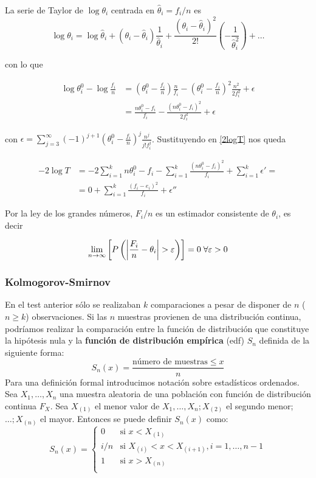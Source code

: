 	La serie de Taylor de $\log \theta_i$ centrada en 
$\hat{\theta}_i = f_i/n$ es
	\[ \log \theta_i = 
			\log \hat{\theta}_i +
			(\theta_i - \hat{\theta}_i)
				\frac{1}{\hat{\theta}_i} +
			\frac{(\theta_i - \hat{\theta}_i)^2}{2!}
				\left(-\frac{1}{\hat{\theta}_i^2}\right) +
			\dots
	\]
	
	con lo que
	
	\begin{align*}	
	 \log \theta_i^0 - \log \frac{f_i}{n} & = 
			\left(
				\theta_i^0 - \frac{f_i}{n}
			\right) \frac{n}{f_i} -
			\left(
				\theta_i^0 - \frac{f_i}{n}
			\right)^2 \frac{n^2}{2f_i^2} + \epsilon \\
		&= \frac{n\theta_i^0 - f_i}{f_i} -
			\frac{(n\theta_i^0 - f_i)^2}{2f_i^2} +\epsilon
	\end{align*}
	
	con $\epsilon = \sum\limits_{j=3}^\infty
			(-1)^{j+1} 
			\left( \theta_i^0 - \frac{f_i}{n}\right)^j
			\frac{n^j}{j!f_i^j}$. Sustituyendo en \ref{2logT} 
nos queda
			
	\begin{align*}
	-2 \log T &= 
		-2 \sum\limits_{i=1}^k n\theta_i^0 - f_i -
		\sum\limits_{i=1}^k 
			\frac{(n\theta_i^0 - f_i)^2}{f_i} + 
		\sum\limits_{i=1}^k \epsilon' = \\
	&= 0 + 
	   \sum\limits_{i=1}^k \frac{(f_i-e_i)^2}{f_i} +
	   \epsilon''	
	\end{align*}	 
	
	Por la ley de los grandes números, $F_i/n$ es un 
estimador consistente de $\theta_i$, es decir
	
	\[ \lim_{n \rightarrow \infty} \left[
			P \left(
				\left\lvert \frac{F_i}{n} - \theta_i \right\rvert 
					> \varepsilon
			\right) \right] = 0 \; \forall \varepsilon > 0 \]
	
	\subsubsection{Kolmogorov-Smirnov}
	
	En el test anterior sólo se realizaban $k$ comparaciones 
a pesar de disponer de $n$ ($n \geq k$) observaciones. Si las 
$n$ muestras provienen de una distribución continua, 
podríamos realizar la comparación entre la función de 
distribución que constituye la hipótesis nula y la 
\textbf{función de distribución empírica} (edf) $S_n$ 
definida de la siguiente forma:
	\[ S_n(x) = \frac{\text{número de muestras} \leq x}{n} \]
	Para una definición formal introducimos notación sobre 
estadísticos ordenados. Sea $X_1, \dots, X_n$ una muestra 
aleatoria de una población con función de distribución 
continua $F_X$. Sea $X_{(1)}$ el menor valor de $X_1, \dots, 
X_n; X_{(2)}$ el segundo menor;$ \dots; X_{(n)}$ el mayor. 
Entonces se puede definir $S_n(x)$ como:
	\[ S_n(x) = 
		\left\lbrace\begin{array}{ll}
			0 & \text{si } x < X_{(1)} \\
			i/n & \text{si } X_{(i)} < x <X_{(i+1)},
				i = 1, \dots, n-1 \\
			1 & \text{si } x > X_{(n)} \\
	\end{array}\right.
	\]
	
